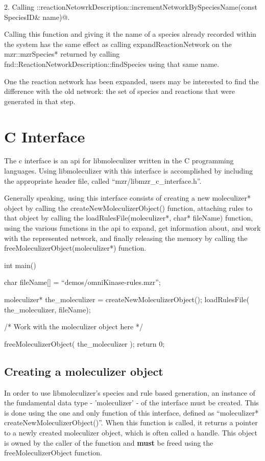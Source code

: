 2.  Calling
\lstinline@fnd::reactionNetowrkDescription::incrementNetworkBySpeciesName(const SpeciesID& name)@.  

Calling this function and giving it the name of a species already
recorded within the system has the same effect as calling
expandReactionNetwork on the mzr::mzrSpecies* returned by calling
fnd::ReactionNetworkDescription::findSpecies using that same name. 

One the reaction network has been expanded, users may be interested to
find the difference with the old network: the set of species and
reactions that were generated in that step.  
















\section{C Interface}
The c interface is an api for libmoleculizer written in the C
programming languages.  Using libmoleculizer with this interface is
accomplished by including the appropriate header file, called
``mzr/libmzr\_c\_interface.h''. 

Generally speaking, using this interface consists of creating a new
moleculizer* object by calling the createNewMoleculizerObject()
function, attaching rules to that object by calling the
loadRulesFile(moleculizer*, char* fileName) function, using the
various functions in the api to expand, get information about, and
work with the represented network, and finally releasing the memory by
calling the freeMoleculizerObject(moleculizer*) function.  

\begin{ExampleC}[caption=Basic example using the c-interface]
  int main(){
    char fileName[] = ``demos/omniKinase-rules.mzr'';
    
    moleculizer* the_moleculizer = createNewMoleculizerObject();
    loadRulesFile( the_moleculizer, fileName);

    /* Work with the moleculizer object here */

    freeMoleculizerObject( the_moleculizer );
    return 0;
    }
\end{ExampleC}

\subsection{Creating a moleculizer object}
In order to use libmoleculizer's species and rule based generation,
an instance of the fundamental data type - 'moleculizer' - of the
interface must be created.  This is done using the one and only
function of this interface, defined as ``moleculizer*
createNewMoleculizerObject()''.  When this function is called, it
returns a pointer to a newly created moleculizer object, which is
often called a handle.  This object is owned by the caller of the
function and {\bf must} be freed using the freeMoleculizerObject
function.

